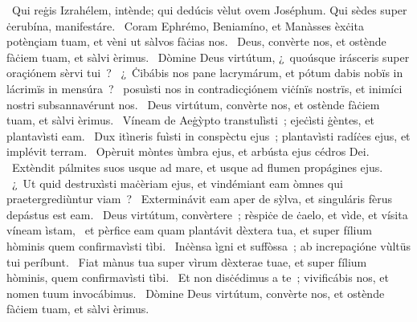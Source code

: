 \psalmChapterWithInscription{}
{ }
{%
~Qui reġis Izrahélem, intènde; qui dedúcis vèlut ovem Joséphum. Qui sèdes super ċerubína, manifestáre. 
~Coram Ephrémo, Beniamíno, et Manàsses èxċita potènçiam tuam, et vèni ut sàlvos fàċias nos. 
~Deus, convèrte nos, et ostènde fàċiem tuam, et sàlvi èrimus. 
~Dòmine Deus virtútum, ¿~quoúsque irásceris super oraçiónem sèrvi tui~? 
~¿~Ċibábis nos pane lacrymárum, et pótum dabis nobïs in lácrimïs in mensúra~? 
~posuìsti nos in contradicçiónem viċínïs nostrïs, et inimíci nostri subsannavérunt nos. 
~Deus virtútum, convèrte nos, et ostènde fàċiem tuam, et sàlvi èrimus. 
~Víneam de Aeġỳpto transtulìsti~; ejeċìsti ġèntes, et plantavìsti eam. 
~Dux itìneris fuìsti in conspèctu ejus~; plantavìsti radíċes ejus, et implévit terram. 
~Opèruit mòntes ùmbra ejus, et arbústa ejus cédros Dei. 
~Extèndit pálmites suos usque ad mare, et usque ad flumen propágines ejus. 
~¿~Ut quid destruxìsti maċèriam ejus, et vindémiant eam òmnes qui praetergrediùntur viam~? 
~Exterminávit eam aper de sỳlva, et singuláris fèrus depástus est eam. 
~Deus virtútum, convèrtere~; rèspiċe de ċaelo, et vìde, et vísita víneam ìstam, 
~et pèrfice eam quam plantávit dèxtera tua, et super fílium hòminis quem confirmavìsti tìbi. 
~Inċènsa ìgni et suffòssa~; ab increpaçióne vùltüs tui períbunt. 
~Fiat mànus tua super vìrum dèxterae tuae, et super fílium hòminis, quem confirmavìsti tìbi. 
~Et non disċédimus a te~; vivificábis nos, et nomen tuum invocábimus. 
~Dòmine Deus virtútum, convèrte nos, et ostènde fàċiem tuam, et sàlvi èrimus. 
}
